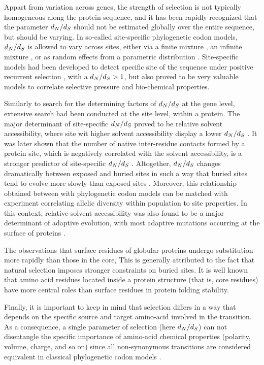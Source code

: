 Appart from variation across genes, the strength of selection is not typically homogeneous along the protein sequence, and it has been rapidly recognized that the parameter $d_N / d_S$ should not be estimated globally over the entire sequence, but should be varying.
In so-called site-specific phylogenetic codon models, $d_N / d_S$ is allowed to vary across sites, either via a finite mixture \citep{Yang2001}, an infinite mixture \citep{Huelsenbeck2006}, or as random effects from a parametric distribution \citep{Lartillot2013}.
Site-specific models had been developed to detect specific site of the sequence under positive recurrent selection \citep{kosiol_patterns_2008}, with a $d_N / d_S>1$, but also proved to be very valuable models to correlate selective pressure and bio-chemical properties.

Similarly to search for the determining factors of $d_N / d_S$ at the gene level, extensive search had been conducted at the site level, within a protein.
The major determinant of site-specific $d_N / d_S$ proved to be relative solvent accessibility, where site wit higher solvent accessibility display a lower $d_N / d_S$ \citep{Ramsey2011}.
It was later shown that the number of native inter-residue contacts formed by a protein site, which is negatively correlated with the solvent accessibility, is a stronger predictor of site-specific $d_N / d_S$ \cite{Yeh2013}.
Altogether, $d_N / d_S$ changes dramatically between exposed and buried sites in such a way that buried sites tend to evolve more slowly than exposed sites \citep{Echave2016}.
Moreover, this relationship obtained between with phylogenetic codon models can be matched with experiment correlating allelic diversity within population to site properties.
In this context, relative solvent accessibility was also found to be a major determinant of adaptive evolution, with most adaptive mutations occurring at the surface of proteins \cite{Moutinho2019}.

The observations that surface residues of globular proteins undergo \gls{substitution} more rapidly than those in the core,
This is generally attributed to the fact that natural selection imposes stronger constraints on buried sites.
It is well known that amino acid residues located inside a protein structure (that is, core residues) have more central roles than surface residues in protein folding stability.

Finally, it is important to keep in mind that selection differs in a way that depends on the specific source and target amino-acid involved in the transition.
As a consequence, a single parameter of selection (here $d_N / d_S$) can not disentangle the specific importance of amino-acid chemical properties (polarity, volume, charge, and so on) since all non-synonymous transitions are considered equivalent in classical phylogenetic codon models \citep{Dutheil2008}.

